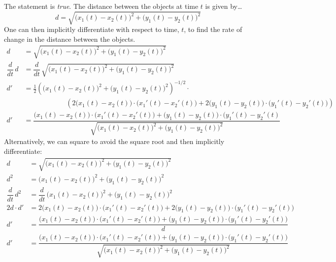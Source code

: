 \documentclass[11pt,letterpaper]{article}
\begin{document}
\sol The statement is \textit{true}. The distance between the objects at time $t$ is given by\dots
	\[
	d= \sqrt{ \big(x_1(t) - x_2(t) \big)^2 + \big(y_1(t) - y_2(t) \big)^2}
	\]
One can then implicitly differentiate with respect to time, $t$, to find the rate of change in the distance between the objects. 
	\[
	\begin{aligned}
	d&= \sqrt{ \big(x_1(t) - x_2(t) \big)^2 + \big(y_1(t) - y_2(t) \big)^2} \\[0.2cm]
	\dfrac{d}{dt} \, d&= \dfrac{d}{dt}\, \sqrt{ \big(x_1(t) - x_2(t) \big)^2 + \big(y_1(t) - y_2(t) \big)^2} \\[0.2cm]
	d'&= \frac{1}{2} \left( \big(x_1(t) - x_2(t) \big)^2 + \big(y_1(t) - y_2(t) \big)^2 \right)^{-1/2} \cdot \\[0.2cm]
	\phantom{d'}&\phantom{= -----} \left( 2 \big(x_1(t) - x_2(t) \big) \cdot \big(x_1'(t) - x_2'(t) \big) + 2 \big( y_1(t) - y_2(t) \big) \cdot \big( y_1'(t) - y_2'(t) \big) \right)  \\[0.2cm]
	d'&= \dfrac{\big(x_1(t) - x_2(t) \big) \cdot \big(x_1'(t) - x_2'(t) \big) + \big( y_1(t) - y_2(t) \big) \cdot \big( y_1'(t) - y_2'(t)}{\sqrt{\big(x_1(t) - x_2(t) \big)^2 + \big(y_1(t) - y_2(t) \big)^2}}
	\end{aligned}
	\]
Alternatively, we can square to avoid the square root and then implicitly differentiate: 
	\[
	\begin{aligned}
	d&= \sqrt{ \big(x_1(t) - x_2(t) \big)^2 + \big(y_1(t) - y_2(t) \big)^2} \\[0.2cm]
	d^2&= \big(x_1(t) - x_2(t) \big)^2 + \big(y_1(t) - y_2(t) \big)^2 \\[0.2cm]
	\dfrac{d}{dt}\, d^2 &= \dfrac{d}{dt}\, \big(x_1(t) - x_2(t) \big)^2 + \big(y_1(t) - y_2(t) \big)^2 \\[0.2cm]
	2d \cdot d' &= 2 \big(x_1(t) - x_2(t) \big) \cdot \big(x_1'(t) - x_2'(t) \big) + 2 \big(y_1(t) - y_2(t) \big) \cdot \big(y_1'(t) - y_2'(t) \big) \\[0.2cm]
	d' &= \dfrac{\big(x_1(t) - x_2(t) \big) \cdot \big(x_1'(t) - x_2'(t) \big) + \big(y_1(t) - y_2(t) \big) \cdot \big(y_1'(t) - y_2'(t) \big)}{d} \\[0.2cm]
	d' &= \dfrac{\big(x_1(t) - x_2(t) \big) \cdot \big(x_1'(t) - x_2'(t) \big) + \big(y_1(t) - y_2(t) \big) \cdot \big(y_1'(t) - y_2'(t) \big)}{\sqrt{ \big(x_1(t) - x_2(t) \big)^2 + \big(y_1(t) - y_2(t) \big)^2}}
	\end{aligned}
	\]
\end{document}
